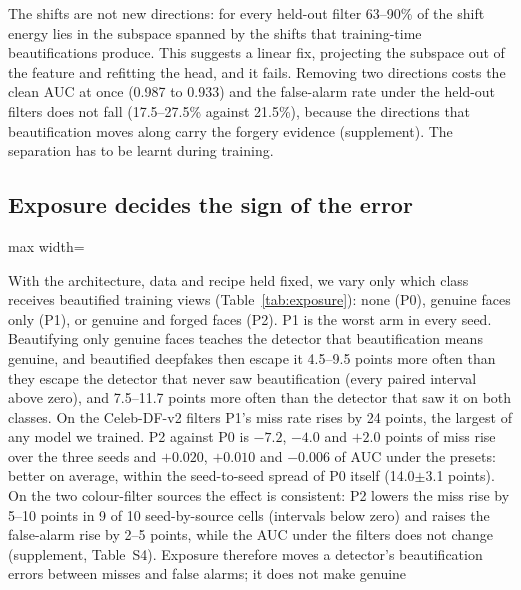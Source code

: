 \documentclass[conference]{IEEEtran}
\begin{document}
The shifts are not new directions: for every held-out filter 63--90\% of the shift energy lies in the subspace spanned
by the shifts that training-time beautifications produce. This suggests a linear fix, projecting the subspace out of the
feature and refitting the head, and it fails. Removing two directions costs the clean AUC at once (0.987 to 0.933) and the
false-alarm rate under the held-out filters does not fall (17.5--27.5\% against 21.5\%), because the directions that
beautification moves along carry the forgery evidence (supplement). The separation has to be learnt during training.

\subsection{Exposure decides the sign of the error}
\label{sec:exposure}
\begin{table}[t]
\centering
\caption{Which class receives beautified training views. FF++ only, forged head only, everything else identical; three
seeds. Celeb-DF-B under the one rule. P1 is reliably the worst; P2 is on average the best.}
\label{tab:exposure}
\scriptsize
\begin{adjustbox}{max width=\columnwidth}\end{adjustbox}
\end{table}
With the architecture, data and recipe held fixed, we vary only which class receives beautified training views
(Table~\ref{tab:exposure}): none (P0), genuine faces only (P1), or genuine and forged faces (P2). P1 is the worst arm in
every seed. Beautifying only genuine faces teaches the detector that beautification means genuine, and beautified
deepfakes then escape it 4.5--9.5 points more often than they escape the detector that never saw beautification (every
paired interval above zero), and 7.5--11.7 points more often than the detector that saw it on both classes. On the
Celeb-DF-v2 filters P1's miss rate rises by 24 points, the largest of any model we trained. P2 against P0 is $-7.2$,
$-4.0$ and $+2.0$ points of miss rise over the three seeds and $+0.020$, $+0.010$ and $-0.006$ of AUC under the presets:
better on average, within the seed-to-seed spread of P0 itself (14.0$\pm$3.1 points). On the two colour-filter sources
the effect is consistent: P2 lowers the miss rise by 5--10 points in 9 of 10 seed-by-source cells (intervals below zero)
and raises the false-alarm rise by 2--5 points, while the AUC under the filters does not change (supplement, Table~S4).
Exposure therefore moves a detector's beautification errors between misses and false alarms; it does not make genuine
\end{document}
